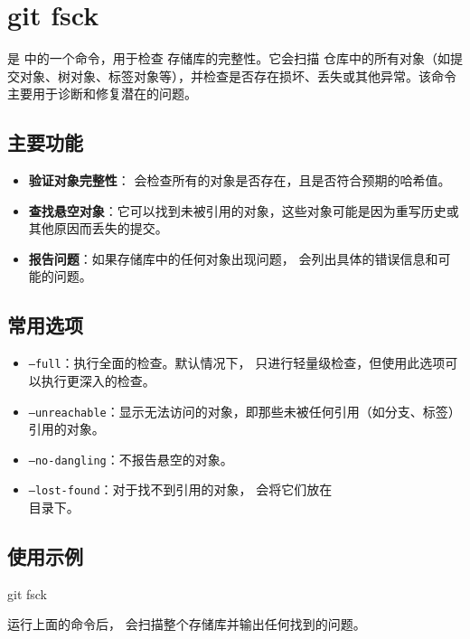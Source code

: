 \section{git fsck}

 是  中的一个命令，用于检查  存储库的完整性。它会扫描  仓库中的所有对象（如提交对象、树对象、标签对象等），并检查是否存在损坏、丢失或其他异常。该命令主要用于诊断和修复潜在的问题。

\subsection*{主要功能}
\begin{itemize}
	\item \textbf{验证对象完整性}： 会检查所有的对象是否存在，且是否符合预期的哈希值。
	\item \textbf{查找悬空对象}：它可以找到未被引用的对象，这些对象可能是因为重写历史或其他原因而丢失的提交。
	\item \textbf{报告问题}：如果存储库中的任何对象出现问题， 会列出具体的错误信息和可能的问题。
\end{itemize}

\subsection*{常用选项}
\begin{itemize}
	\item \texttt{--full}：执行全面的检查。默认情况下， 只进行轻量级检查，但使用此选项可以执行更深入的检查。
	\item \texttt{--unreachable}：显示无法访问的对象，即那些未被任何引用（如分支、标签）引用的对象。
	\item \texttt{--no-dangling}：不报告悬空的对象。
	\item \texttt{--lost-found}：对于找不到引用的对象， 会将它们放在\\  目录下。
\end{itemize}

\subsection*{使用示例}
\begin{shellcmd}
git fsck
\end{shellcmd}

运行上面的命令后， 会扫描整个存储库并输出任何找到的问题。

